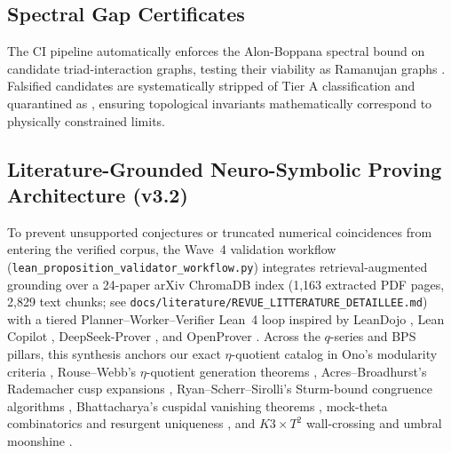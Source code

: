 \subsection{Spectral Gap Certificates}
The CI pipeline automatically enforces the Alon-Boppana spectral bound on candidate triad-interaction graphs, testing their viability as Ramanujan graphs \cite{LPS1988, MSS2015}. Falsified candidates are systematically stripped of Tier A classification and quarantined as \tierX{}, ensuring topological invariants mathematically correspond to physically constrained limits.

\subsection{Literature-Grounded Neuro-Symbolic Proving Architecture (v3.2)}
To prevent unsupported conjectures or truncated numerical coincidences from entering the verified corpus, the Wave~4 validation workflow (\texttt{lean\_proposition\_validator\_workflow.py}) integrates retrieval-augmented grounding over a 24-paper arXiv ChromaDB index (1,163 extracted PDF pages, 2,829 text chunks; see \texttt{docs/literature/REVUE\_LITTERATURE\_DETAILLEE.md}) with a tiered Planner--Worker--Verifier Lean~4 loop inspired by LeanDojo \cite{Yang2023LeanDojo}, Lean Copilot \cite{Song2024LeanCopilot}, DeepSeek-Prover \cite{Xin2024DeepSeekProver}, and OpenProver \cite{Kripner2026OpenProver}. Across the $q$-series and BPS pillars, this synthesis anchors our exact $\eta$-quotient catalog in Ono's modularity criteria \cite{Ono2004}, Rouse--Webb's $\eta$-quotient generation theorems \cite{RouseWebb2015}, Acres--Broadhurst's Rademacher cusp expansions \cite{AcresBroadhurst2018}, Ryan--Scherr--Sirolli's Sturm-bound congruence algorithms \cite{RyanScherrSirolli2019}, Bhattacharya's cuspidal vanishing theorems \cite{Bhattacharya2026}, mock-theta combinatorics and resurgent uniqueness \cite{MalmendierOno2012, BallantineBursonFolsom2022, CostinDunneSaraeb2026}, and $K3\times T^2$ wall-crossing and umbral moonshine \cite{DMZ2012, CDH2014}.
